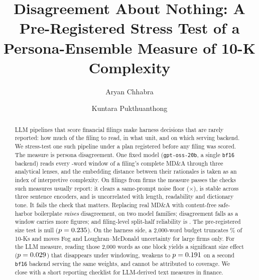 \documentclass[sigconf,nonacm]{acmart}
\begin{document}
\title{Disagreement About Nothing: A Pre-Registered Stress Test of a
Persona-Ensemble Measure of 10-K Complexity}

\author{Aryan Chhabra}

\author{Kuntara Pukthuanthong}

\begin{abstract}
LLM pipelines that score financial filings make harness decisions that are rarely
reported: how much of the filing to read, in what unit, and on which serving backend.
We stress-test one such pipeline under a plan registered before any filing was scored.
The measure is persona disagreement. One fixed model (\texttt{gpt-oss-20b}, a single
\texttt{bf16} backend) reads every \ChunkWords-word window of a filing's complete MD\&A
through three analytical lenses, and the embedding distance between their rationales
is taken as an index of interpretive complexity. On \NFilings{} filings from \NFirms{}
firms the measure passes the checks such measures usually report: it clears a
same-prompt noise floor (\NoiseRatio$\times$), is stable across three sentence
encoders, and is uncorrelated with length, readability and dictionary tone. It fails
the check that matters. Replacing real MD\&A with content-free safe-harbor boilerplate
\emph{raises} disagreement, on two model families; disagreement falls as a window
carries more figures; and filing-level split-half reliability is \SplitHalfSB. The
pre-registered size test is null ($p=0.235$). On the harness side, a
2,000-word budget truncates \ScaleTruncTwoK\% of \ScaleNUsable{} 10-Ks and moves Fog
and Loughran--McDonald uncertainty for large firms only. For the LLM measure, reading
those 2,000 words as one block yields a significant size effect ($p=0.029$) that
disappears under windowing, weakens to $p=0.191$ on a second \texttt{bf16}
backend serving the same weights, and cannot be attributed to coverage. We close with a short reporting
checklist for LLM-derived text measures in finance.
\end{abstract}

\end{document}
